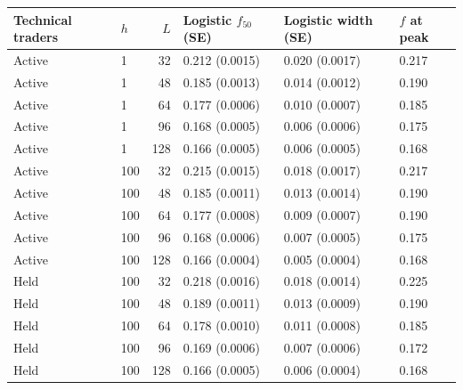 \begin{center}
\begin{minipage}{\linewidth}\centering
\captionsetup{type=table,hypcap=false}
\caption{Logistic fits and susceptibility maxima over 50 starting markets and 3,000 post-switch steps. Parentheses give whole-market bootstrap standard errors (SE). The fitted curve imposes increasing probability; interpolated crossings do not. The final column gives the tested fraction with the largest susceptibility, so its precision is limited by the spacing of nearby tested fractions.}
\label{tab:revision-fits}
\small
\begin{tabular}{llrlll}
\toprule
Technical traders & $h$ & $L$ & Logistic $f_{50}$ (SE) & Logistic width (SE) & $f$ at peak \\
\midrule
Active & 1 & 32 & 0.212 (0.0015) & 0.020 (0.0017) & 0.217 \\
Active & 1 & 48 & 0.185 (0.0013) & 0.014 (0.0012) & 0.190 \\
Active & 1 & 64 & 0.177 (0.0006) & 0.010 (0.0007) & 0.185 \\
Active & 1 & 96 & 0.168 (0.0005) & 0.006 (0.0006) & 0.175 \\
Active & 1 & 128 & 0.166 (0.0005) & 0.006 (0.0005) & 0.168 \\
\midrule
Active & 100 & 32 & 0.215 (0.0015) & 0.018 (0.0017) & 0.217 \\
Active & 100 & 48 & 0.185 (0.0011) & 0.013 (0.0014) & 0.190 \\
Active & 100 & 64 & 0.177 (0.0008) & 0.009 (0.0007) & 0.190 \\
Active & 100 & 96 & 0.168 (0.0006) & 0.007 (0.0005) & 0.175 \\
Active & 100 & 128 & 0.166 (0.0004) & 0.005 (0.0004) & 0.168 \\
\midrule
Held & 100 & 32 & 0.218 (0.0016) & 0.018 (0.0014) & 0.225 \\
Held & 100 & 48 & 0.189 (0.0011) & 0.013 (0.0009) & 0.190 \\
Held & 100 & 64 & 0.178 (0.0010) & 0.011 (0.0008) & 0.185 \\
Held & 100 & 96 & 0.169 (0.0006) & 0.007 (0.0006) & 0.172 \\
Held & 100 & 128 & 0.166 (0.0005) & 0.006 (0.0004) & 0.168 \\
\bottomrule
\end{tabular}
\end{minipage}
\end{center}
